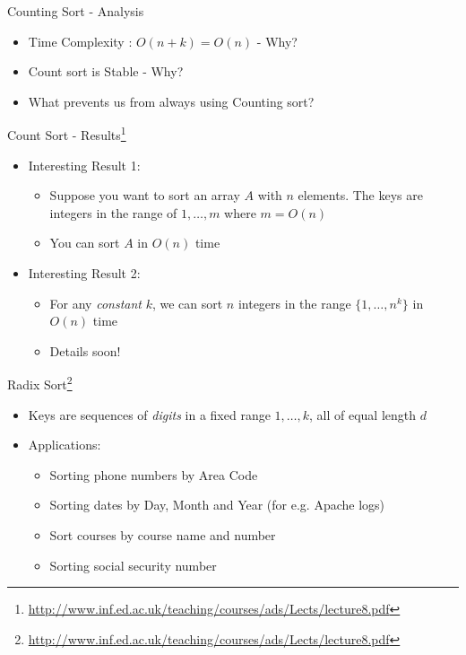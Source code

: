 \documentclass{beamer}
\begin{document}
\begin{frame}{Counting Sort - Analysis}
\begin{itemize}
\item Time Complexity : $O(n+k) = O(n)$ - Why?
\item Count sort is Stable - Why?
\item What prevents us from always using Counting sort?
\end{itemize}
\end{frame}


\begin{frame}{Count Sort - Results\footnote{\url{http://www.inf.ed.ac.uk/teaching/courses/ads/Lects/lecture8.pdf}}}
\begin{itemize}
\item Interesting Result 1:
\begin{itemize}
    \item Suppose you want to sort an array $A$ with $n$ elements. The keys are integers in the range of $1, \ldots, m$ where $m=O(n)$
    \item You can sort $A$ in $O(n)$ time
\end{itemize}
\item Interesting Result 2:
\begin{itemize}
    \item For any {\em constant} $k$, we can sort $n$ integers in the range $\{1, \ldots, n^k\}$ in $O(n)$ time
    \item Details soon!
\end{itemize}
\end{itemize}
\end{frame}


\begin{frame}{Radix Sort\footnote{\url{http://www.inf.ed.ac.uk/teaching/courses/ads/Lects/lecture8.pdf}}}
\begin{itemize}
\item Keys are sequences of {\em digits} in a fixed range $1, \ldots, k$, all of equal length $d$ 
\item Applications:
\begin{itemize}
    \item Sorting phone numbers by Area Code
    \item Sorting dates by Day, Month and Year (for e.g. Apache logs)
    \item Sort courses by course name and number
    \item Sorting social security number
\end{itemize}
\end{itemize}
\end{frame}
\end{document}
